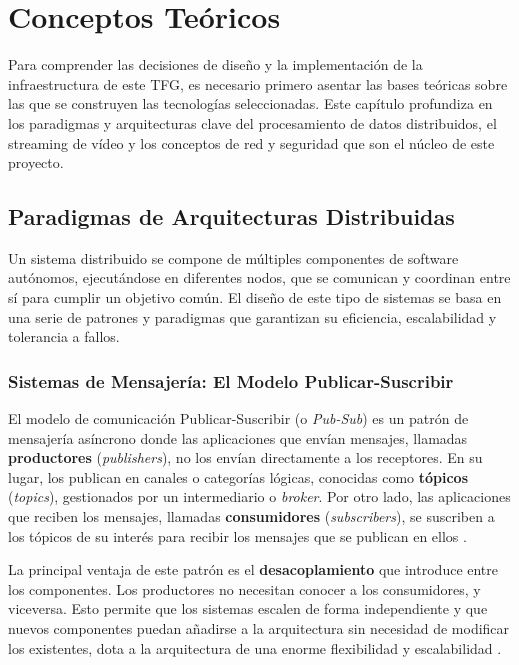 \chapter{Conceptos Teóricos}
\label{chap:conceptos}

Para comprender las decisiones de diseño y la implementación de la infraestructura de este TFG, es necesario primero asentar las bases teóricas sobre las que se construyen las tecnologías seleccionadas. Este capítulo profundiza en los paradigmas y arquitecturas clave del procesamiento de datos distribuidos, el streaming de vídeo y los conceptos de red y seguridad que son el núcleo de este proyecto.

\section{Paradigmas de Arquitecturas Distribuidas}
\label{sec:conceptos_arquitecturas}
Un sistema distribuido se compone de múltiples componentes de software autónomos, ejecutándose en diferentes nodos, que se comunican y coordinan entre sí para cumplir un objetivo común. El diseño de este tipo de sistemas se basa en una serie de patrones y paradigmas que garantizan su eficiencia, escalabilidad y tolerancia a fallos.

\subsection{Sistemas de Mensajería: El Modelo Publicar-Suscribir}
El modelo de comunicación Publicar-Suscribir (o \textit{Pub-Sub}) es un patrón de mensajería asíncrono donde las aplicaciones que envían mensajes, llamadas \textbf{productores} (\textit{publishers}), no los envían directamente a los receptores. En su lugar, los publican en canales o categorías lógicas, conocidas como \textbf{tópicos} (\textit{topics}), gestionados por un intermediario o \textit{broker}. Por otro lado, las aplicaciones que reciben los mensajes, llamadas \textbf{consumidores} (\textit{subscribers}), se suscriben a los tópicos de su interés para recibir los mensajes que se publican en ellos \cite{birman2007guide}.

La principal ventaja de este patrón es el \textbf{desacoplamiento} que introduce entre los componentes. Los productores no necesitan conocer a los consumidores, y viceversa. Esto permite que los sistemas escalen de forma independiente y que nuevos componentes puedan añadirse a la arquitectura sin necesidad de modificar los existentes, dota a la arquitectura de una enorme flexibilidad y escalabilidad \cite{kleppmann2017designing}.

